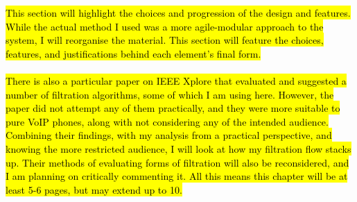 \documentclass[main.tex]{subfiles}
\begin{document}
\hl{This section will highlight the choices and progression of the design and features. While the actual method I used was a more agile-modular approach to the system, I will reorganise the material. This section will feature the choices, features, and justifications behind each element's final form.}
\\\\
\hl{There is also a particular paper on IEEE Xplore that evaluated and suggested a number of filtration algorithms, some of which I am using here. However, the paper did not attempt any of them practically, and they were more suitable to pure VoIP phones, along with not considering any of the intended audience. Combining their findings, with my analysis from a practical perspective, and knowing the more restricted audience, I will look at how my filtration flow stacks up. Their methods of evaluating forms of filtration will also be reconsidered, and I am planning on critically commenting it. All this means this chapter will be at least 5-6 pages, but may extend up to 10.}
\end{document}
